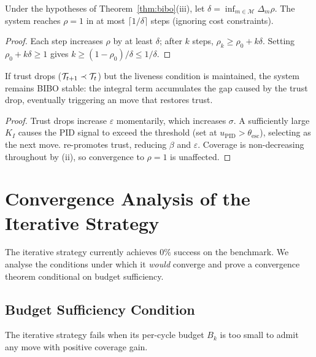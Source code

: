 \documentclass[11pt]{article}
\newcommand{\vcov}{\rho}                   %
\newcommand{\vgap}{\varepsilon}            %
\newcommand{\vint}{\sigma}                 %
\newcommand{\Ki}{K_I}                      %
\newcommand{\vpid}{{u_{\mathrm{PID}}}}       %
\newcommand{\obcount}{\beta}              %
\newcommand{\moves}{\mathcal{M}}           %
\begin{document}
\begin{corollary}
  \label{cor:time}
  Under the hypotheses of Theorem~\ref{thm:bibo}(iii), let
  $\delta = \inf_{m \in \moves}\Delta_m\vcov$.  The system reaches
  $\vcov = 1$ in at most $\lceil 1/\delta \rceil$ steps (ignoring cost
  constraints).
\end{corollary}
\begin{proof}
  Each step increases $\vcov$ by at least $\delta$; after $k$ steps,
  $\vcov_k \geq \vcov_0 + k\delta$.  Setting $\vcov_0 + k\delta \geq 1$
  gives $k \geq (1 - \vcov_0)/\delta \leq 1/\delta$.
\end{proof}

\begin{corollary}
  \label{cor:trust}
  If trust drops (\ie $\mathcal{T}_{t+1} \prec \mathcal{T}_t$) but the liveness
  condition is maintained, the system remains BIBO stable: the
  integral term accumulates the gap caused by the trust drop,
  eventually triggering an \ESCALATE{} move that restores trust.
\end{corollary}
\begin{proof}
  Trust drops increase $\vgap$ momentarily, which increases $\vint$.
  A sufficiently large $\Ki$ causes the PID signal to exceed the
  \ESCALATE{} threshold (set at $\vpid > \theta_\text{esc}$), selecting
  \ESCALATE{} as the next move.  \ESCALATE{} re-promotes trust, reducing
  $\obcount$ and $\vgap$.  Coverage is non-decreasing throughout by
  (ii), so convergence to $\vcov = 1$ is unaffected.
\end{proof}

\section{Convergence Analysis of the Iterative Strategy}
\label{sec:iterconv}

The iterative strategy currently achieves $0\%$ success on the
benchmark.  We analyse the conditions under which it \emph{would}
converge and prove a convergence theorem conditional on budget
sufficiency.

\subsection{Budget Sufficiency Condition}

The iterative strategy fails when its per-cycle budget $B_k$ is too
small to admit any move with positive coverage gain.
\end{document}

